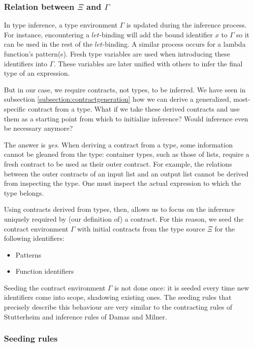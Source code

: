 \documentclass[10pt]{report}
\begin{document}
\subsubsection{Relation between $\Xi$ and $\Gamma$}

In type inference, a type environment $\Gamma$ is updated during the inference process.
For instance, encountering a $let$-binding will add the bound identifier $x$ to $\Gamma$ so it can be used in the rest of the $let$-binding.
A similar process occurs for a lambda function's pattern(s).
Fresh type variables are used when introducing these identifiers into $\Gamma$.
These variables are later unified with others to infer the final type of an expression.

But in our case, we require contracts, not types, to be inferred.
We have seen in subsection \ref{subsection:contractgeneration} how we can derive a generalized, most-specific contract from a type.
What if we take these derived contracts and use them as a starting point from which to initialize inference?
Would inference even be necessary anymore?

The answer is \textit{yes}.
When deriving a contract from a type, some information cannot be gleaned from the type: container types, such as those of lists, require a fresh contract to be used as their outer contract.
For example, the relations between the outer contracts of an input list and an output list cannot be derived from inspecting the type.
One must inspect the actual expression to which the type belongs.

Using contracts derived from types, then, allows us to focus on the inference uniquely required by (our definition of) a contract.
For this reason, we seed the contract environment $\Gamma$ with initial contracts from the type source $\Xi$ for the following identifiers:

\begin{itemize}
	\item Patterns
	\item Function identifiers
\end{itemize}

Seeding the contract environment $\Gamma$ is not done once: it is seeded every time new identifiers come into scope, shadowing existing ones.
The seeding rules that precisely describe this behaviour are very similar to the contracting rules of Stutterheim and inference rules of Damas and Milner.

\subsubsection{Seeding rules}
\end{document}
